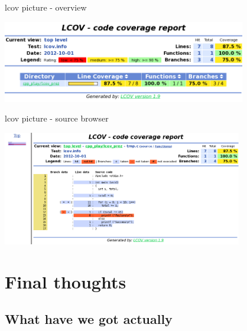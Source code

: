 \documentclass{beamer}
\begin{document}

\begin{frame}{lcov picture - overview}

\begin{center}
\includegraphics[height=3.6cm]{tmp_c_lcov_overview.png}
\end{center}

\end{frame}


\begin{frame}{lcov picture - source browser}

\begin{center}
\includegraphics[height=5cm]{tmp_c_lcov_source.png}
\end{center}

\end{frame}


\section{Final thoughts}

\subsection{What have we got actually}
\end{document}
